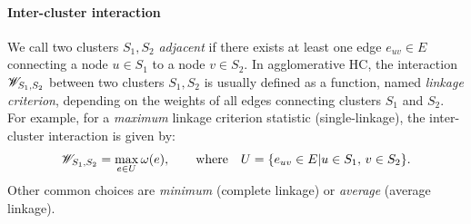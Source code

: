 \paragraph{Inter-cluster interaction}\label{par:linkage_criterion_def} We call two clusters $S_1,S_2$ \emph{adjacent} if there exists at least one edge ${e_{uv}\in E}$ connecting a node $u\in S_1$ to a node $v\in S_2$. In agglomerative HC, the interaction $\mathscr{W}_{S_1,S_2}$ between two clusters $S_1, S_2$ is usually defined as a function, named \emph{linkage criterion}, depending on the weights of all edges connecting clusters $S_1$ and $S_2$. For example, for a \emph{maximum} linkage criterion statistic (single-linkage), the inter-cluster interaction is given by:
\begin{equation}\label{eq:max_linkage}
\mathscr{W}_{S_1,S_2} = \max_{e\in U} \omega(e), \qquad \text{where}\quad U = \{ e_{uv} \in E | u \in S_1, \, v \in S_2 \}.
\end{equation}
Other common choices are \emph{minimum} (complete linkage) or \emph{average} (average linkage). %

